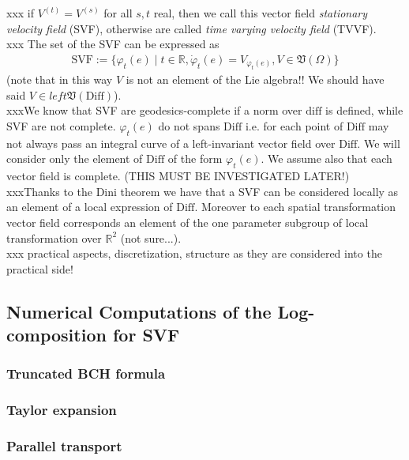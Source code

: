 \noindent
xxx if $V^{(t)} = V^{(s)}$ for all $s,t$ real, then we call this vector field \emph{stationary velocity field} (SVF), otherwise are called \emph{time varying velocity field} (TVVF).\\
xxx The set of the SVF can be expressed as
\begin{align*}
\text{SVF} := \lbrace \varphi_{t}(e) \mid t \in \mathbb{R}, \dot{\varphi}_{t}(e) = V_{\varphi_{t}(e)},  V \in \mathfrak{V}(\Omega) \rbrace
\end{align*}
(note that in this way $V$ is not an element of the Lie algebra!! We should have said $V \in left\mathfrak{V}(\text{Diff})$).\\
xxxWe know that SVF are geodesics-complete if a norm over $\text{diff}$ is defined, while SVF are not complete. $\varphi_{t}(e)$ do not spans $\text{Diff}$ i.e. for each point of $\text{Diff}$ may not always pass an integral curve of a left-invariant vector field over $\text{Diff}$. We will consider only the element of $\text{Diff}$ of the form $\varphi_{t}(e)$. We assume also that each vector field is complete. (THIS MUST BE INVESTIGATED LATER!)\\
xxxThanks to the Dini theorem we have that a SVF can be considered locally as an element of a local expression of $\text{Diff}$.
Moreover to each spatial transformation vector field corresponds an element of the one parameter subgroup of local transformation over $\mathbb{R}^2$ (not sure...).\\

xxx practical aspects, discretization, structure as they are considered into the practical side!



\subsection{Numerical Computations of the Log-composition for SVF}



\subsubsection{Truncated BCH formula}

\subsubsection{Taylor expansion}

\subsubsection{Parallel transport}

